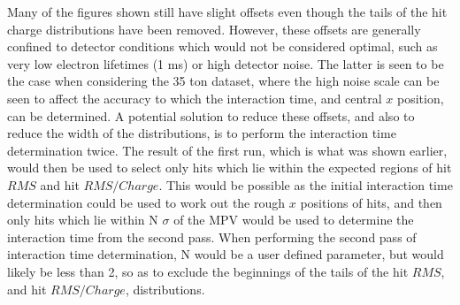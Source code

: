 Many of the figures shown still have slight offsets even though the tails of the hit charge distributions have been removed. However, these offsets are generally confined to detector conditions which would not be considered optimal, such as very low electron lifetimes (1 ms) or high detector noise. The latter is seen to be the case when considering the 35 ton dataset, where the high noise scale can be seen to affect the accuracy to which the interaction time, and central $x$ position, can be determined. A potential solution to reduce these offsets, and also to reduce the width of the distributions, is to perform the interaction time determination twice. The result of the first run, which is what was shown earlier, would then be used to select only hits which lie within the expected regions of hit $RMS$ and hit $RMS/Charge$. This would be possible as the initial interaction time determination could be used to work out the rough $x$ positions of hits, and then only hits which lie within N $\sigma$ of the MPV would be used to determine the interaction time from the second pass. When performing the second pass of interaction time determination, N would be a user defined parameter, but would likely be less than 2, so as to exclude the beginnings of the tails of the hit $RMS$, and hit $RMS/Charge$, distributions. \\



